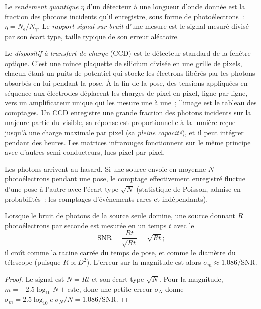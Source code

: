 \begin{definition}\label{def:b1:observing-the-sky:detector}
Le \emph{rendement quantique} $\eta$ d'un détecteur à une longueur d'onde donnée est
la fraction des photons incidents qu'il enregistre, sous forme de
photoélectrons~: $\eta = N_\mathrm{e}/N_\gamma$. Le
\emph{rapport signal sur bruit} d'une mesure
est le signal mesuré divisé par son écart type, taille typique de son erreur
aléatoire.
\end{definition}

Le \emph{dispositif à transfert de charge} (CCD) est le détecteur standard de
la fenêtre optique. C'est une mince plaquette de silicium divisée en une grille
de pixels, chacun étant un puits de potentiel qui stocke les électrons libérés
par les photons absorbés en lui pendant la pose. À la fin de la pose, des
tensions appliquées en séquence aux électrodes déplacent les charges de pixel
en pixel, ligne par ligne, vers un amplificateur unique qui les mesure une à
une~; l'image est le tableau des comptages. Un CCD enregistre une grande
fraction des photons incidents sur la majeure partie du visible, sa réponse
est proportionnelle à la lumière reçue jusqu'à une charge maximale par pixel
(sa \emph{pleine capacité}), et il peut intégrer pendant des heures. Les
matrices infrarouges fonctionnent sur le même principe avec d'autres
semi-conducteurs, lues pixel par pixel.

Les photons arrivent au hasard. Si une source envoie en moyenne $N$
photoélectrons pendant une pose, le comptage effectivement enregistré fluctue
d'une pose à l'autre avec l'écart type $\sqrt N$ (statistique de Poisson,
admise en probabilités~: les comptages d'événements rares et indépendants).

\begin{proposition}\label{prop:b1:observing-the-sky:snr}
Lorsque le bruit de photons de la source seule domine, une source donnant $R$
photoélectrons par seconde est mesurée en un temps $t$ avec le 
\[
  \mathrm{SNR} = \frac{Rt}{\sqrt{Rt}} = \sqrt{Rt} ;
\]
il croît comme la racine carrée du temps de pose, et comme le diamètre du
télescope (puisque $R \propto D^2$). L'erreur sur la magnitude est alors
$\sigma_m \approx 1.086/\mathrm{SNR}$.
\end{proposition}

\begin{proof}
Le signal est $N = Rt$ et son écart type $\sqrt N$. Pour la magnitude,
$m = -2.5\log_{10}N + \text{cste}$, donc une petite erreur $\sigma_N$ donne
$\sigma_m = 2.5\log_{10}e\;\sigma_N/N = 1.086/\mathrm{SNR}$.
\end{proof}

